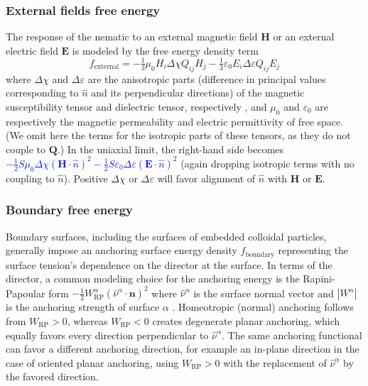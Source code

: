 \documentclass[utf8]{frontiersFPHY} %
\newcommand{\DAB}[1]{\textcolor{blue}{#1}}
\newcommand{\Q}{\mathbf{Q}}
\begin{document}
\subsubsection{External fields free energy}

The response of the nematic to an external magnetic field $\mathbf{H}$ or an external electric field $\mathbf{E}$ is modeled by the free energy density term
\begin{equation}
f_{\mathrm{external}} = - \tfrac{1}{3} \mu_0 H_i \Delta \chi Q_{ij} H_j  - \tfrac{1}{3}  \varepsilon_0 E_i \Delta \varepsilon Q_{ij} E_j 
\end{equation}
where $\Delta \chi$ and $\Delta \varepsilon$ are the anisotropic parts (difference in principal values corresponding to $\hat n$ and its perpendicular directions) of the magnetic susceptibility tensor and dielectric tensor, respectively \cite{Kralj1992}, and $\mu_0$ and $\varepsilon_0$ are respectively the magnetic permeability and electric permittivity of free space. (We omit here the terms for the isotropic parts of these tensors, as they do not couple to $\Q$.) In the uniaxial limit, the right-hand side becomes 
\DAB{$-\frac{1}{2} S \mu_0  \Delta \chi  (\mathbf{H}\cdot \hat n )^2  - \frac{1}{2}  S\varepsilon_0 \Delta \varepsilon (\mathbf{E}\cdot \hat n )^2$}
 (again dropping isotropic terms with no coupling to $\hat n $). Positive $\Delta \chi$ or $\Delta \varepsilon$ will favor alignment of $\hat n $ with $\mathbf{H}$ or $\mathbf{E}$. 

\subsubsection{Boundary free energy}

Boundary surfaces, including the surfaces of embedded colloidal particles, generally impose an anchoring surface energy density $f_{\mathrm{boundary}}$ representing the surface tension's dependence on the director at the surface. In terms of the director, a common modeling choice for  the anchoring energy is the Rapini-Papoular form $-\tfrac{1}{2} W^\alpha_{\mathrm{RP}} (\hat \nu^\alpha \cdot \mathbf{n})^2$ where $\hat \nu^\alpha$ is the surface normal vector  and $|W^\alpha|$ is the anchoring strength of surface $\alpha$ \cite{rapini1969distorsion}. Homeotropic (normal) anchoring follows from $W_{\mathrm{RP}}>0$, whereas $W_{\mathrm{RP}}<0$ creates degenerate planar anchoring, which equally favors every direction perpendicular to $\hat \nu^\alpha$. The same anchoring functional can favor a different anchoring direction, for example an in-plane direction in the case of oriented planar anchoring, using $W_{\mathrm{RP}}>0$ with the replacement of $\hat \nu^\alpha$ by the favored direction. 
\end{document}
